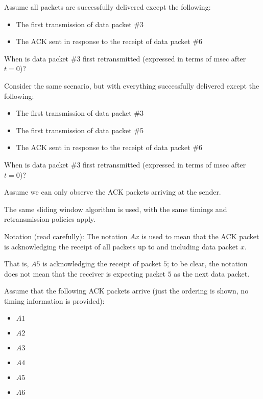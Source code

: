 \documentclass{supervision}
\begin{document}
\begin{questions}
\begin{parts}
            \begin{subparts}
              \subpart Assume all packets are successfully delivered except the
                following:
                \begin{itemize}
                  \item The first transmission of data packet \#3
                  \item The ACK sent in response to the receipt of data packet
                    \#6
                \end{itemize}
                When is data packet \#3 first retransmitted (expressed in terms
                of msec after $t=0$)?

              \subpart Consider the same scenario, but with everything
                successfully delivered except the following:
                \begin{itemize}
                  \item The first transmission of data packet \#3
                  \item The first transmission of data packet \#5
                  \item The ACK sent in response to the receipt of data packet
                    \#6
                \end{itemize}

                When is data packet \#3 first retransmitted (expressed in terms
                of msec after $t=0$)?

              \subpart Assume we can only observe the ACK packets arriving at
                the sender.

                The same sliding window algorithm is used, with the same
                timings and retransmission policies apply.

                Notation (read carefully): The notation $Ax$ is used to mean
                that the ACK packet is acknowledging the receipt of all packets
                up to and including data packet $x$.

                That is, $A5$ is acknowledging the receipt of packet $5$; to be
                clear, the notation does not mean that the receiver is
                expecting packet $5$ as the next data packet.

                Assume that the following ACK packets arrive (just the ordering
                is shown, no timing information is provided):

                \begin{itemize}
                  \item $A1$
                  \item $A2$
                  \item $A3$
                  \item $A4$
                  \item $A5$
                  \item $A6$
                \end{itemize}


\end{subparts}
\end{parts}
\end{questions}
\end{document}
